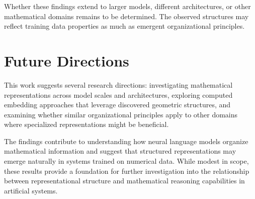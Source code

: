 \documentclass[
  a4paper, twoside, 10pt, titlepage]{book}
\begin{document}
Whether these findings extend to larger models, different architectures,
or other mathematical domains remains to be determined. The observed
structures may reflect training data properties as much as emergent
organizational principles.

\section{Future Directions}\label{future-directions}

This work suggests several research directions: investigating
mathematical representations across model scales and architectures,
exploring computed embedding approaches that leverage discovered
geometric structures, and examining whether similar organizational
principles apply to other domains where specialized representations
might be beneficial.

The findings contribute to understanding how neural language models
organize mathematical information and suggest that structured
representations may emerge naturally in systems trained on numerical
data. While modest in scope, these results provide a foundation for
further investigation into the relationship between representational
structure and mathematical reasoning capabilities in artificial systems.
\end{document}
